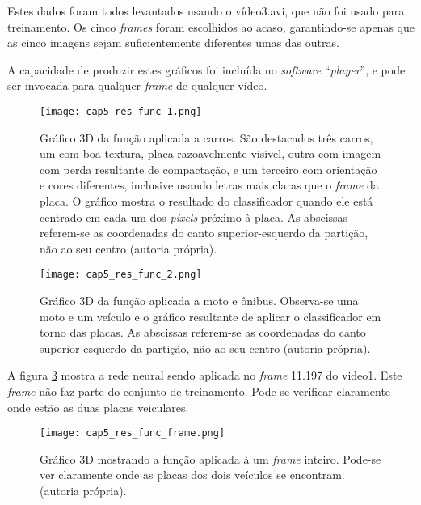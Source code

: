 Estes dados foram todos levantados usando o vídeo3.avi, que não foi usado para
treinamento. Os cinco \emph{frames} foram escolhidos ao acaso, garantindo-se
apenas que as cinco imagens sejam suficientemente diferentes umas das outras.

A capacidade de produzir estes gráficos foi incluída no \emph{software}
``\emph{player}'', e pode ser invocada para qualquer \emph{frame} de qualquer
vídeo.

\begin{figure}[!htb]
	\centering
	\texttt{[image: cap5\_res\_func\_1.png]}
	\caption[Gráfico 3D da função aplicada a carros]{
		Gráfico 3D da função aplicada a carros.
		São destacados três carros, um com boa textura, placa razoavelmente
		visível, outra com imagem com perda resultante de compactação, e um
		terceiro com orientação e cores diferentes, inclusive usando letras mais
		claras que o \emph{frame} da placa. O gráfico mostra o resultado do
		classificador quando ele está centrado em cada um dos \emph{pixels}
		próximo à placa.
		As abscissas referem-se as coordenadas do canto superior-esquerdo da
		partição, não ao seu centro (autoria própria).}
	\label{fig:cap5_res_func_1}
\end{figure}

\begin{figure}[!htb]
	\centering
	\texttt{[image: cap5\_res\_func\_2.png]}
	\caption[Gráfico 3D da função aplicada a moto e ônibus]{
		Gráfico 3D da função aplicada a moto e ônibus.
		Observa-se uma moto e um veículo e o gráfico resultante de aplicar o
		classificador em torno das placas. As abscissas referem-se as coordenadas
		do canto superior-esquerdo da partição, não ao seu centro (autoria
		própria).}
	\label{fig:cap5_res_func_2}
\end{figure}

A figura \ref{fig:cap5_res_func_frame} mostra a rede neural sendo aplicada
no \emph{frame} 11.197 do video1. Este \emph{frame} não faz parte do conjunto
de treinamento. Pode-se verificar claramente onde estão as duas placas
veiculares.

\begin{figure}[!htb]
	\centering
	\texttt{[image: cap5\_res\_func\_frame.png]}
	\caption[Gráfico 3D mostrando a função aplicada à um \emph{frame} inteiro]{
		Gráfico 3D mostrando a função aplicada à um \emph{frame} inteiro.
		Pode-se ver claramente onde as placas dos dois veículos se encontram.
		(autoria própria).}
	\label{fig:cap5_res_func_frame}
\end{figure}

